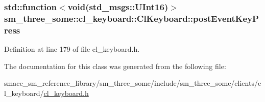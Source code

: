 \subsubsection[{\texorpdfstring{post\+Event\+Key\+Press}{postEventKeyPress}}]{\setlength{\rightskip}{0pt plus 5cm}std\+::function$<$void(std\+\_\+msgs\+::\+U\+Int16)$>$ sm\+\_\+three\+\_\+some\+::cl\+\_\+keyboard\+::\+Cl\+Keyboard\+::post\+Event\+Key\+Press}\hypertarget{classsm__three__some_1_1cl__keyboard_1_1ClKeyboard_abb3140ba3850b4e20f201a697b7f8388}{}\label{classsm__three__some_1_1cl__keyboard_1_1ClKeyboard_abb3140ba3850b4e20f201a697b7f8388}


Definition at line 179 of file cl\+\_\+keyboard.\+h.



The documentation for this class was generated from the following file\+:\begin{DoxyCompactItemize}
\item 
smacc\+\_\+sm\+\_\+reference\+\_\+library/sm\+\_\+three\+\_\+some/include/sm\+\_\+three\+\_\+some/clients/cl\+\_\+keyboard/\hyperlink{cl__keyboard_8h}{cl\+\_\+keyboard.\+h}\end{DoxyCompactItemize}
